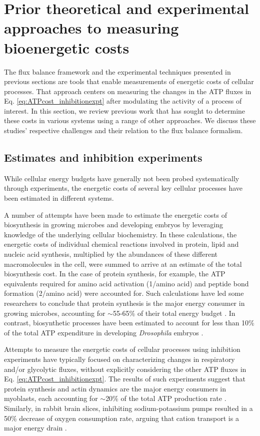 \documentclass{compactarticle}
\begin{document}
\section{Prior theoretical and experimental approaches to measuring bioenergetic costs}

The flux balance framework and the experimental techniques presented in previous sections are tools that enable measurements of energetic costs of cellular processes. That approach centers on measuring the changes in the ATP fluxes in Eq. \ref{eq:ATPcost_inhibitionexpt} after modulating the activity of a process of interest. In this section, we review previous work that has sought to determine these costs in various systems using a range of other approaches. We discuss these studies' respective challenges and their relation to the flux balance formalism.


\subsection{Estimates and inhibition experiments}

While cellular energy budgets have generally not been probed systematically through experiments, the energetic costs of several key cellular processes have been estimated in different systems. 

A number of attempts have been made to estimate the energetic costs of biosynthesis in growing microbes and developing embryos by leveraging knowledge of the underlying cellular biochemistry. In these calculations, the energetic costs of individual chemical reactions involved in protein, lipid and nucleic acid synthesis, multiplied by the abundances of these different macromolecules in the cell, were summed to arrive at an estimate of the total biosynthesis cost. In the case of protein synthesis, for example, the ATP equivalents required for amino acid activation (1/amino acid) and peptide bond formation (2/amino acid) were accounted for. Such calculations have led some researchers to conclude that  protein synthesis is the major energy consumer in growing microbes, accounting for $\sim$55-65\% of their total energy budget \cite{forrest1971generation,stouthamer1973theoretical, lynch2015bioenergetic}. In contrast, biosynthetic processes have been estimated to account for less than 10\% of the total ATP expenditure in developing \textit{Drosophila} embryos \cite{song_energy_2019}.

Attempts to measure the energetic costs of cellular processes using inhibition experiments have typically focused on characterizing changes in respiratory and/or glycolytic fluxes, without explicitly considering the other ATP fluxes in Eq. \ref{eq:ATPcost_inhibitionexpt}. The results of such experiments suggest that protein synthesis and actin dynamics are the major energy consumers in myoblasts, each accounting for $\sim$20\% of the total ATP production rate \cite{mookerjee2017quantifying}. Similarly, in rabbit brain slices, inhibiting sodium-potassium pumps resulted in a 50\% decrease of oxygen consumption rate, arguing that cation transport is a major energy drain \cite{whittam1962dependence}.
\end{document}
